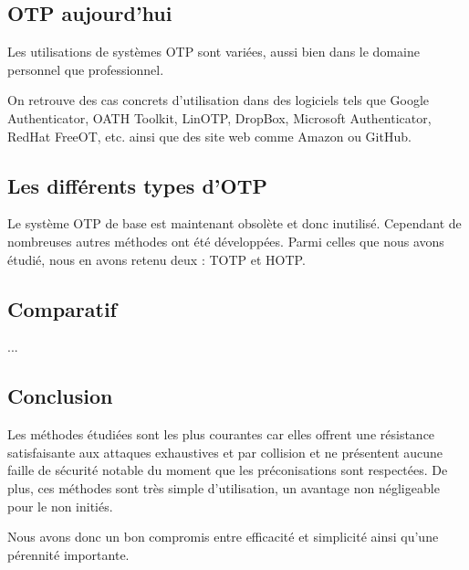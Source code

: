 \subsection{OTP aujourd'hui}
	
	Les utilisations de systèmes OTP sont variées, aussi bien dans le domaine 
	personnel que professionnel.
	
	On retrouve des cas concrets d'utilisation dans des logiciels tels que Google 
	Authenticator, OATH Toolkit, LinOTP, DropBox, Microsoft Authenticator, RedHat 
	FreeOT, etc. ainsi que des site web comme Amazon ou GitHub.

\subsection{Les différents types d'OTP}

	Le système OTP de base est maintenant obsolète et donc inutilisé. Cependant de
	nombreuses autres méthodes ont été développées. Parmi celles que nous avons 
	étudié, nous en avons retenu deux : TOTP et HOTP.

\subsection{Comparatif}

	...

\subsection{Conclusion}

	Les méthodes étudiées sont les plus courantes car elles offrent une résistance
	satisfaisante aux 	attaques exhaustives et par collision et ne présentent 
	aucune faille de sécurité notable du moment que les préconisations sont 
	respectées. De plus, ces méthodes sont très simple d'utilisation, un avantage
	non négligeable pour le non initiés. 
	
	Nous avons donc un bon compromis entre efficacité et simplicité ainsi qu'une 
	pérennité importante.